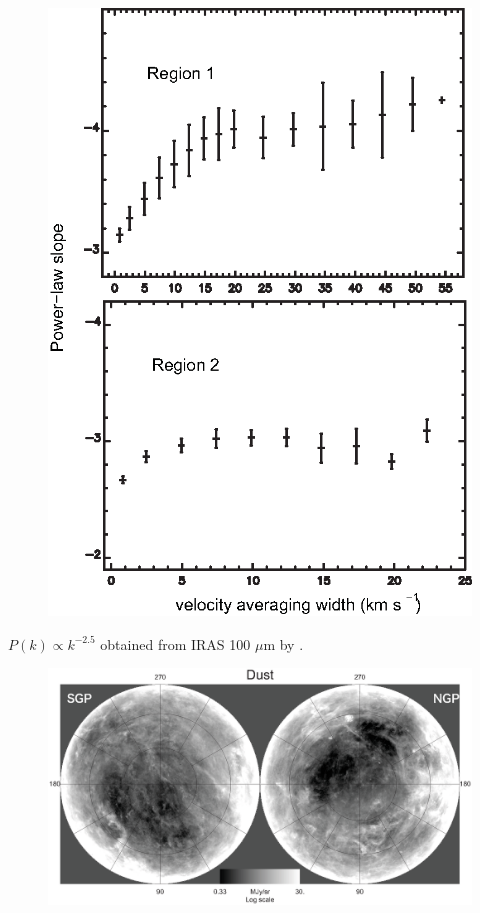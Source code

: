\documentclass[12pt]{article}
\begin{document}
\begin{figure}[hb]
              \includegraphics[totalheight=80 mm]{img/Dickey2001_region1+2.eps}
            \end{figure}   
        \clearpage
        \begin{small}
        $P(k)\propto k^{-2.5}$ obtained from IRAS 100 $\mu$m by \cite{1998ApJ...500..525S}.
        \end{small}
            \begin{figure}[hb]
              \centering
              \includegraphics[totalheight=80 mm]{img/Schlege1998_map.eps}
            \end{figure}   
\end{document}
